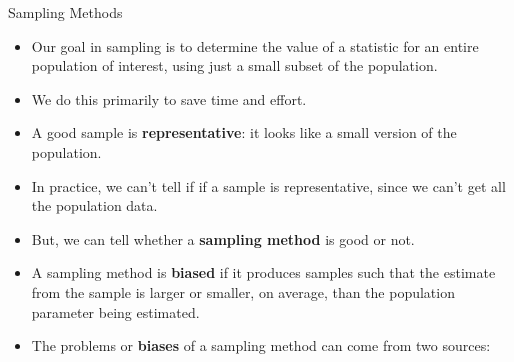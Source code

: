 \documentclass[handout]{beamer}
\begin{document}
\begin{frame}{Sampling Methods}
\scriptsize{


\begin{itemize}


 \item Our goal in sampling is to determine the value of a statistic for an entire population of interest, using just a small subset of the population.
 
\item We do this primarily to save time and effort.

\item A good sample is \textbf{representative}: it looks like a small version of the population.


\item In practice, we can't tell if if a sample is representative, since we can't get all the population data.

\item But, we can tell whether a \textbf{sampling method} is good or not.


\item A sampling method is \textbf{biased} if it produces samples such that the estimate from the sample is larger or smaller, on average, than the population parameter being estimated.



\item The problems or \textbf{biases} of a sampling method can come from two sources: 



\end{itemize}




} 
\end{frame}
\end{document}
